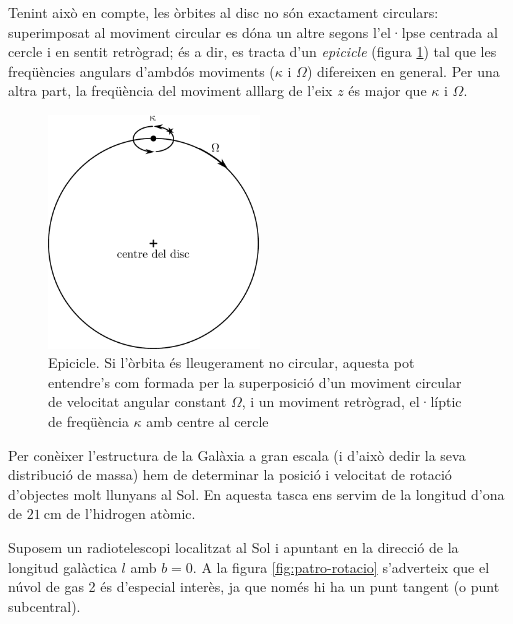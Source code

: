Tenint això en compte, les òrbites al disc no són exactament circulars: superimposat al moviment circular es dóna un altre segons l'el·lpse centrada al cercle i en sentit retrògrad; és a dir, es tracta d'un \textit{epicicle} (figura \ref{fig:galaxy-epicycle}) tal que les freqüències angulars d'ambdós moviments ($\kappa$ i $\Omega$) difereixen en general. Per una altra part, la freqüència del moviment alllarg de l'eix $z$ és major que $\kappa$ i $\Omega$.
\begin{figure}[h]
	\centering
	\includegraphics[width=0.5\textwidth]{./images/7-galaxy-epicycle}
	\caption{Epicicle. Si l'òrbita és lleugerament no circular, aquesta pot entendre's com formada per la superposició d'un moviment circular de velocitat angular constant $\Omega$, i un moviment retrògrad, el·líptic de freqüència $\kappa$ amb centre al cercle}
	\label{fig:galaxy-epicycle}
\end{figure}

Per conèixer l'estructura de la Galàxia a gran escala (i d'això dedir la seva distribució de massa) hem de determinar la posició i velocitat de rotació d'objectes molt llunyans al Sol. En aquesta tasca ens servim de la longitud d'ona de $\SI{21}{\cm}$ de l'hidrogen atòmic.

Suposem un radiotelescopi localitzat al Sol i apuntant en la direcció de la longitud galàctica $l$ amb $b = 0$. A la figura \ref{fig:patro-rotacio} s'adverteix que el núvol de gas 2 és d'especial interès, ja que només hi ha un punt tangent (o punt subcentral).

